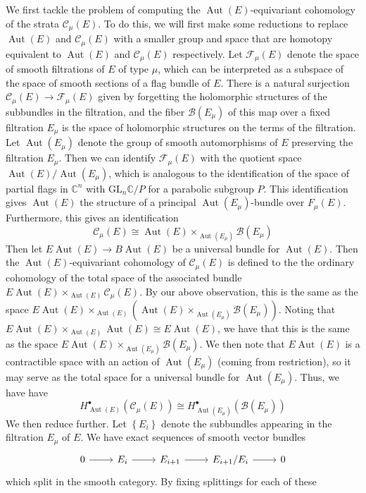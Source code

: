 \documentclass[psamsfonts, 12pt]{amsart}
\theoremstyle{definition}
\theoremstyle{remark}
\newcommand{\C}{\mathbb{C}}
\newcommand{\GL}{\mathrm{GL}}
\newcommand{\set}[1]{\left\lbrace #1 \right\rbrace}
\DeclareMathOperator{\Aut}{Aut}
\begin{document}
We first tackle the problem of computing the $\Aut(E)$-equivariant cohomology of
the strata $\mathscr{C}_\mu(E)$. To do this, we will first make some reductions
to replace $\Aut(E)$ and $\mathscr{C}_\mu(E)$ with a smaller group and space
that are homotopy equivalent to $\Aut(E)$ and $\mathscr{C}_\mu(E)$ respectively.
Let $\mathscr{F}_\mu(E)$ denote the space of smooth filtrations of $E$ of
type $\mu$, which can be interpreted as a subspace of the space of smooth
sections of a flag bundle of $E$. There is a natural surjection
$\mathscr{C}_\mu(E) \to \mathscr{F}_\mu(E)$ given by forgetting the holomorphic
structures of the subbundles in the filtration, and the fiber $\mathscr{B}(E_\mu)$
of this map over a fixed filtration $E_\mu$ is the space of holomorphic structures
on the terms of the filtration. Let $\Aut(E_\mu)$ denote the group of smooth
automorphisms of $E$ preserving the filtration $E_\mu$. Then we can identify
$\mathscr{F}_\mu(E)$ with the quotient space $\Aut(E)/\Aut(E_\mu)$, which is
analogous to the identification of the space of partial flags in $\C^n$ with
$\GL_n\C/P$ for a parabolic subgroup $P$. This identification gives $\Aut(E)$ the
structure of a principal $\Aut(E_\mu)$-bundle over $F_\mu(E)$. Furthermore,
this gives an identification
\[
\mathscr{C}_\mu(E) \cong \Aut(E) \times_{\Aut(E_\mu)} \mathscr{B}(E_\mu)
\]
Then let $E\Aut(E) \to B\Aut(E)$ be a universal bundle for $\Aut(E)$. Then
the $\Aut(E)$-equivariant cohomology of $\mathscr{C}_\mu(E)$ is defined to the
the ordinary cohomology of the total space of the associated bundle
$E\Aut(E) \times_{\Aut(E)} \mathscr{C}_\mu(E)$. By our above observation, this
is the same as the space
$E\Aut(E) \times_{\Aut(E)} (\Aut(E) \times_{\Aut(E_\mu)} \mathscr{B}(E_\mu))$.
Noting that $E\Aut(E) \times_{\Aut(E)} \Aut(E) \cong E\Aut(E)$, we have that
this is the same as the space $E\Aut(E) \times_{\Aut(E_\mu)} \mathscr{B}(E_\mu)$.
We then note that $E\Aut(E)$ is a contractible space with an action of
$\Aut(E_\mu)$ (coming from restriction), so it may serve as the total space
for a universal bundle for $\Aut(E_\mu)$. Thus, we have have
\[
H^\bullet_{\Aut(E)}(\mathscr{C}_\mu(E)) \cong
H^\bullet_{\Aut(E_\mu)}(\mathscr{B}(E_\mu))
\]
We then reduce further. Let $\set{E_i}$ denote the subbundles appearing in
the filtration $E_\mu$ of $E$. We have exact sequences of smooth vector bundles
\[\begin{tikzcd}
0 \ar[r] & E_i \ar[r] & E_{i+1} \ar[r] & E_{i+1}/E_i \ar[r] & 0
\end{tikzcd}\]
which split in the smooth category. By fixing splittings for each of these
\end{document}
